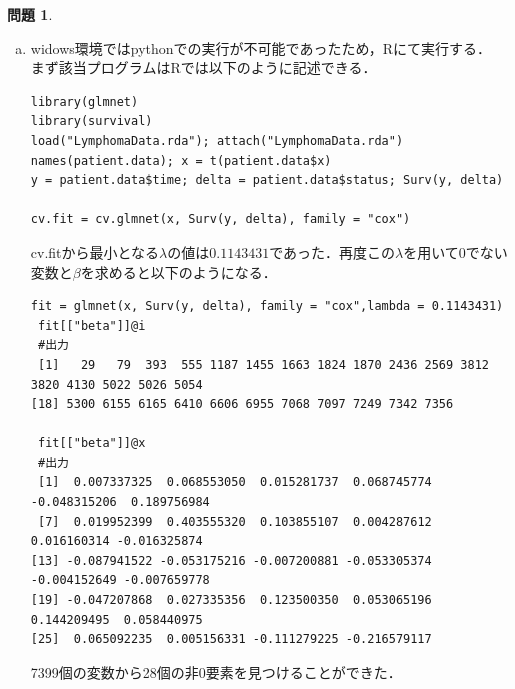 \documentclass[titlepage]{jsarticle}
\theoremstyle{definition}
\newtheorem{Ex}{問題}
\theoremstyle{mystyle} %
\renewcommand{\footnotesize}{\normalsize}
\begin{document}
\begin{Ex}
\begin{enumerate}[(a)]
\item widows環境ではpythonでの実行が不可能であったため，Rにて実行する．\\
まず該当プログラムはRでは以下のように記述できる．
\begin{lstlisting}[basicstyle = \ttfamily\footnotesize, frame = single]
library(glmnet)
library(survival)
load("LymphomaData.rda"); attach("LymphomaData.rda")
names(patient.data); x = t(patient.data$x)
y = patient.data$time; delta = patient.data$status; Surv(y, delta)

cv.fit = cv.glmnet(x, Surv(y, delta), family = "cox")
\end{lstlisting}
cv.fitから最小となる$\lambda$の値は$0.1143431$であった．再度この$\lambda$を用いて$0$でない変数と$\beta$を求めると以下のようになる．\\
\begin{lstlisting}[basicstyle = \ttfamily\footnotesize, frame = single]
fit = glmnet(x, Surv(y, delta), family = "cox",lambda = 0.1143431)
 fit[["beta"]]@i
 #出力
 [1]   29   79  393  555 1187 1455 1663 1824 1870 2436 2569 3812 3820 4130 5022 5026 5054
[18] 5300 6155 6165 6410 6606 6955 7068 7097 7249 7342 7356

 fit[["beta"]]@x
 #出力
 [1]  0.007337325  0.068553050  0.015281737  0.068745774 -0.048315206  0.189756984
 [7]  0.019952399  0.403555320  0.103855107  0.004287612  0.016160314 -0.016325874
[13] -0.087941522 -0.053175216 -0.007200881 -0.053305374 -0.004152649 -0.007659778
[19] -0.047207868  0.027335356  0.123500350  0.053065196  0.144209495  0.058440975
[25]  0.065092235  0.005156331 -0.111279225 -0.216579117
\end{lstlisting}
7399個の変数から28個の非$0$要素を見つけることができた．\\


\end{enumerate}
\end{Ex}
\end{document}
